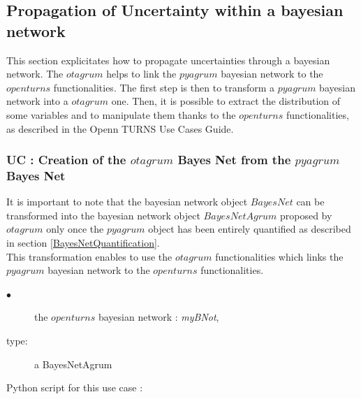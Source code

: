 \newpage \subsection{Propagation of Uncertainty within a bayesian network} \label{BayesNetPropagation}

This section explicitates how to propagate uncertainties through a bayesian network. The $otagrum$ helps to link the $pyagrum$ bayesian network to the $openturns$ functionalities. The first step is then to transform a $pyagrum$ bayesian network into a $otagrum$ one. Then, it is possible to extract the distribution of some variables and to manipulate them thanks to the $openturns$ functionalities, as described in the Openn TURNS Use Cases Guide.




\subsubsection{UC : Creation of the $otagrum$ Bayes Net from the $pyagrum$ Bayes Net}

It is important to note that the bayesian network object $BayesNet$ can be transformed into the bayesian network object $BayesNetAgrum$ proposed by $otagrum$ only once the $pyagrum$ object has been entirely quantified as described in section \ref{BayesNetQuantification}.\\
This transformation enables to use the $otagrum$ functionalities which links the $pyagrum$ bayesian network to the $openturns$ functionalities.\\


{
  \begin{description}
  \item[$\bullet$] the $openturns$ bayesian network : {\itshape myBNot},
  \item[type:] a BayesNetAgrum
  \end{description}
}

\espace 

Python  script for this use case :

